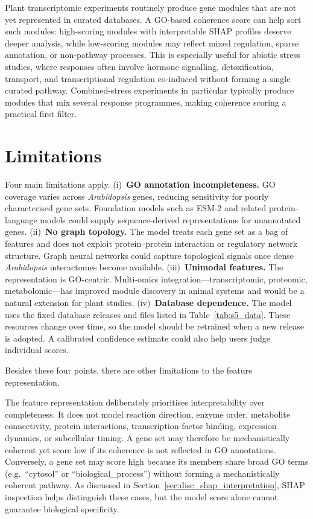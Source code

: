 \documentclass[12pt,letterpaper,oneside,openany]{book}
\begin{document}
Plant transcriptomic experiments routinely produce gene modules that are not yet represented in curated databases. A GO-based coherence score can help sort such modules: high-scoring modules with interpretable SHAP profiles deserve deeper analysis, while low-scoring modules may reflect mixed regulation, sparse annotation, or non-pathway processes. This is especially useful for abiotic stress studies, where responses often involve hormone signalling, detoxification, transport, and transcriptional regulation co-induced without forming a single curated pathway. Combined-stress experiments in particular typically produce modules that mix several response programmes, making coherence scoring a practical first filter.

\section{Limitations}
\label{sec:disc_limitations}

Four main limitations apply.
(i)~\textbf{GO annotation incompleteness.}
GO coverage varies across \textit{Arabidopsis} genes, reducing sensitivity for poorly characterised gene sets. Foundation models such as ESM-2 and related protein-language models \citep{lin2023evolutionary} could supply sequence-derived representations for unannotated genes.
(ii)~\textbf{No graph topology.}
The model treats each gene set as a bag of features and does not exploit protein--protein interaction or regulatory network structure. Graph neural networks \citep{muzio2021biological} could capture topological signals once dense \textit{Arabidopsis} interactomes become available.
(iii)~\textbf{Unimodal features.}
The representation is GO-centric. Multi-omics integration---transcriptomic, proteomic, metabolomic---has improved module discovery in animal systems \citep{hasin2017multiomics} and would be a natural extension for plant studies.
(iv)~\textbf{Database dependence.}
The model uses the fixed database releases and files listed in Table~\ref{tab:s5_data}. These resources change over time, so the model should be retrained when a new release is adopted. A calibrated confidence estimate could also help users judge individual scores.

Besides these four points, there are other limitations to the feature representation.

The feature representation deliberately prioritises interpretability over completeness. It does not model reaction direction, enzyme order, metabolite connectivity, protein interactions, transcription-factor binding, expression dynamics, or subcellular timing. A gene set may therefore be mechanistically coherent yet score low if its coherence is not reflected in GO annotations. Conversely, a gene set may score high because its members share broad GO terms (e.g.\ ``cytosol'' or ``biological\_process'') without forming a mechanistically coherent pathway. As discussed in Section~\ref{sec:disc_shap_interpretation}, SHAP inspection helps distinguish these cases, but the model score alone cannot guarantee biological specificity.
\end{document}
